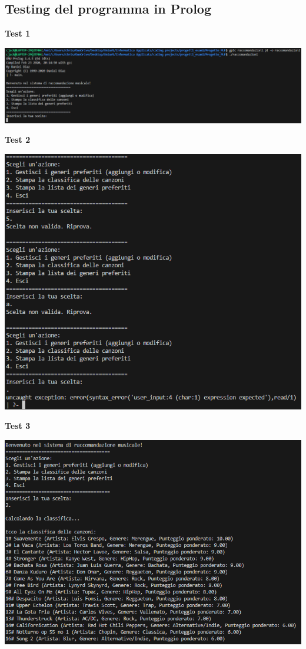 \documentclass[a4paper,11pt]{article}
\begin{document}
\subsection{Testing del programma in Prolog}
\begin{center}
    \textbf{Test 1}
    \par
    \vspace{0.5cm}
    \includegraphics[width=1\textwidth]{ptest1}
\end{center}
\begin{center}
    \textbf{Test 2}
    \par
    \vspace{0.5cm}
    \includegraphics[width=1\textwidth]{ptest2}
\end{center}
\begin{center}
    \textbf{Test 3}
    \par
    \vspace{0.5cm}
    \includegraphics[width=1\textwidth]{ptest3}
\end{center}
\end{document}

